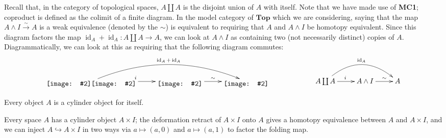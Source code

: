 \documentclass{amsart}
\theoremstyle{definition} \newaliasedtheorem{defn}[thm]{Definition}
\theoremstyle{definition} \newtheorem*{defn*}{Definition}
\theoremstyle{definition} \newaliasedtheorem{xca}[thm]{Exercise}
\theoremstyle{definition} \newtheorem*{soln*}{Solution}
\theoremstyle{definition} \newaliasedtheorem{remark}[thm]{Remark}
\theoremstyle{definition} \newtheorem*{remark*}{Remark}
\newcommand{\xyincludegraphics}[2][]{\raisebox{-0.5\height}{\texttt{[image: \#2]}}}
\newcommand{\cat}[1]{\ensuremath{\mathbf{#1}}}
\DeclareMathOperator{\id}{id}
\begin{document}
    Recall that, in the category of topological spaces, $A \coprod A$ is the disjoint union of $A$ with itself.  Note that we have made use of \textbf{MC1}; coproduct is defined as the colimit of a finite diagram.  In the model category of \cat{Top} which we are considering, saying that the map $A \wedge I \xrightarrow{\sim} A$ is a weak equivalence (denoted by the $\sim$) is equivalent to requiring that $A$ and $A \wedge I$ be homotopy equivalent.  Since this diagram factors the map $\id_A + \id_A : A \coprod A \to A$, we can look at $A \wedge I$ as containing two (not necessarily distinct) copies of $A$.  Diagrammatically, we can look at this as requiring that the following diagram commutes:
    \[
      \xymatrix{
         \xyincludegraphics[width=3em]{cylinder_object-A_1}\xyincludegraphics[width=3em]{cylinder_object-A_0} \ar[r]^i \ar@/^2pc/[rr]^{\id_A + \id_A}
         & \xyincludegraphics[width=3em]{cylinder_object-A^I} \ar[r]^-{\sim} & \xyincludegraphics[width=3em]{cylinder_object-A} %
      }
      \qquad\qquad\qquad
      \xymatrix{
        A\coprod A \ar[r]^i \ar@/^2pc/[rr]^{\id_A}& A \wedge I \ar[r]^-{\sim} & A %
      }
    \]
    
    \begin{example}
      Every object $A$ is a cylinder object for itself.
    \end{example}
    
    \begin{example}
      Every space $A$ has a cylinder object $A \times I$; the deformation retract of $A \times I$ onto $A$ gives a homotopy equivalence between $A$ and $A \times I$, and we can inject $A \hookrightarrow A \times I$ in two ways via $a \mapsto (a, 0)$ and $a \mapsto (a, 1)$ to factor the folding map.
    \end{example}
\end{document}
